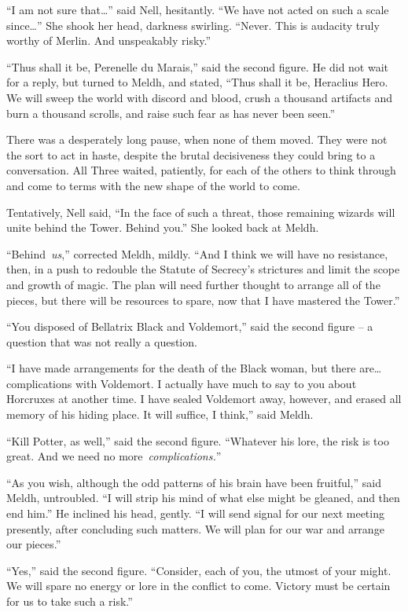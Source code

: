 ``I am not sure that\ldots{}'' said Nell, hesitantly. ``We have not
acted on such a scale since\ldots{}'' She shook her head, darkness
swirling. ``Never. This is audacity truly worthy of Merlin. And
unspeakably risky.''

``Thus shall it be, Perenelle du Marais,'' said the second figure. He
did not wait for a reply, but turned to Meldh, and stated, ``Thus shall
it be, Heraclius Hero. We will sweep the world with discord and blood,
crush a thousand artifacts and burn a thousand scrolls, and raise such
fear as has never been seen.''

There was a desperately long pause, when none of them moved. They were
not the sort to act in haste, despite the brutal decisiveness they could
bring to a conversation. All Three waited, patiently, for each of the
others to think through and come to terms with the new shape of the
world to come.

Tentatively, Nell said, ``In the face of such a threat, those remaining
wizards will unite behind the Tower. Behind you.'' She looked back at
Meldh.

``Behind~\emph{us},'' corrected Meldh, mildly. ``And I think we will
have no resistance, then, in a push to redouble the Statute of Secrecy's
strictures and limit the scope and growth of magic. The plan will need
further thought to arrange all of the pieces, but there will be
resources to spare, now that I have mastered the Tower.''

``You disposed of Bellatrix Black and Voldemort,'' said the second
figure -- a question that was not really a question.

``I have made arrangements for the death of the Black woman, but there
are\ldots{} complications with Voldemort. I actually have much to say to
you about Horcruxes at another time. I have sealed Voldemort away,
however, and erased all memory of his hiding place. It will suffice, I
think,'' said Meldh.

``Kill Potter, as well,'' said the second figure. ``Whatever his lore,
the risk is too great. And we need no more~\emph{complications.}''

``As you wish, although the odd patterns of his brain have been
fruitful,'' said Meldh, untroubled. ``I will strip his mind of what else
might be gleaned, and then end him.'' He inclined his head, gently. ``I
will send signal for our next meeting presently, after concluding such
matters. We will plan for our war and arrange our pieces.''

``Yes,'' said the second figure. ``Consider, each of you, the utmost of
your might. We will spare no energy or lore in the conflict to come.
Victory must be certain for us to take such a risk.''

